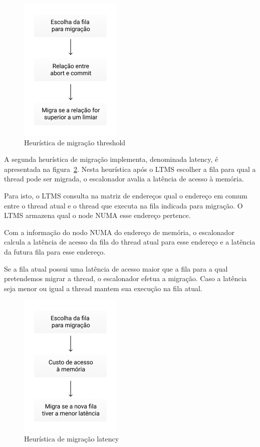 \documentclass[diss,capa]{texufpel}
\begin{document}
\begin{figure}[htbp]
  \centering
  \includegraphics[scale=.8]{images/threshold.png}
\caption{Heurística de migração threshold}
\label{threshold}
\end{figure}

A segunda heurística de migração implementa, denominada latency, é apresentada na figura~\ref{latency}. Nesta heurística após o LTMS escolher a fila para qual a thread pode ser migrada, o escalonador avalia a latência de acesso à memória.

Para isto, o LTMS consulta na matriz de endereços qual o endereço em comum entre o thread atual e o thread que executa na fila indicada para migração. O LTMS armazena qual o node NUMA esse endereço pertence.

Com a informação do nodo NUMA do endereço de memória, o escalonador calcula a latência de acesso da fila do thread atual para esse endereço e a latência da futura fila para esse endereço.

Se a fila atual possui uma latência de acesso maior que a fila para a qual pretendemos migrar a thread, o escalonador efetua a migração. Caso a latência seja menor ou igual a thread mantem sua execução na fila atual.

\begin{figure}[htbp]
  \centering
  \includegraphics[scale=.8]{images/latency.png}
  \caption{Heurística de migração latency}
\label{latency}
\end{figure}
\end{document}
